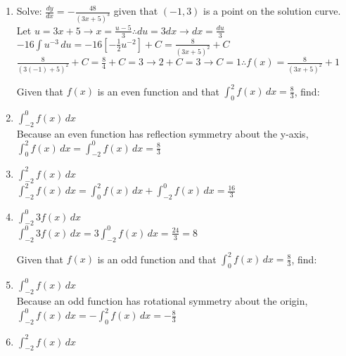 \documentclass[10pt, letterpaper]{report}
\begin{document}
\begin{enumerate}
\hline
  \item{Solve: $\frac{dy}{dx}=-\frac{48}{(3x+5)^{3}}$ given that $(-1,3)$ is a point on the solution curve.} \\

    Let $u=3x+5\rightarrow x=\frac{u-5}{3}\therefore du=3dx\rightarrow dx=\frac{du}{3}$ \\

    $-16\int{u^{-3}}\,du=
    -16[-\frac{1}{2}u^{-2}]+C=
    \frac{8}{(3x+5)^{2}}+C$ \\

    $\frac{8}{(3(-1)+5)^{2}}+C=\frac{8}{4}+C=3\rightarrow 2+C=3\rightarrow C=1\therefore f(x)=\frac{8}{(3x+5)^{2}}+1$ \\

\hline
  \par Given that $f(x)$ is an even function and that $\int_{0}^{2}{f(x)}\,dx=\frac{8}{3}$, find:
  \item{$\int_{-2}^{0}{f(x)}\,dx$} \\

    Because an even function has reflection symmetry about the y-axis,
    $\int_{0}^{2}{f(x)}\,dx=\int_{-2}^{0}{f(x)}\,dx=\frac{8}{3}$ \\

  \item{$\int_{-2}^{2}{f(x)}\,dx$} \\

    $\int_{-2}^{2}{f(x)}\,dx=\int_{0}^{2}{f(x)}\,dx+\int_{-2}^{0}{f(x)}\,dx=\frac{16}{3}$ \\

  \item{$\int_{-2}^{0}{3f(x)}\,dx$} \\

    $\int_{-2}^{0}{3f(x)}\,dx=3\int_{-2}^{0}{f(x)}\,dx=\frac{24}{3}=8$ \\

\hline
  \par Given that $f(x)$ is an odd function and that $\int_{0}^{2}{f(x)}\,dx=\frac{8}{3}$, find:
  \item{$\int_{-2}^{0}{f(x)}\,dx$} \\

    Because an odd function has rotational symmetry about the origin,
    $\int_{-2}^{0}{f(x)}\,dx=-\int_{0}^{2}{f(x)}\,dx=-\frac{8}{3}$ \\

  \item{$\int_{-2}^{2}{f(x)}\,dx$} \\


\end{enumerate}
\end{document}
